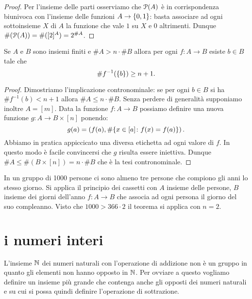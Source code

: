 \begin{proof}
Per l'insieme delle parti osserviamo che $\P(A)$ è in corrispondenza biunivoca con
l'insieme delle funzioni $A\to \ENCLOSE{0,1}$: basta associare ad ogni sottoinsieme $X$ di $A$ 
la funzione che vale $1$ su $X$ e $0$ altrimenti. 
Dunque $\#(\P(A)) = \#([2]^A) = 2^{\#A}$.
\end{proof}

\begin{theorem}
Se $A$ e $B$ sono insiemi finiti e $\#A > n\cdot \#B$ allora 
per ogni $f\colon A \to B$ esiste $b\in B$ tale che 
\[
 \# f^{-1}(\ENCLOSE{b}) \ge n+1.
\]
\end{theorem}
\begin{proof}
Dimostriamo l'implicazione contronominale: se per ogni $b\in B$ si ha $\# f^{-1}(b) < n+1$
allora $\#A \le n\cdot \#B$.
Senza perdere di generalità supponiamo inoltre $A=[m]$.
Data la funzione $f\colon A\to B$ possiamo definire una nuova funzione $g\colon A\to B\times[n]$ 
ponendo:
\[
  g(a) = \left(f(a),\# \ENCLOSE{x\in [a]\colon f(x)=f(a)}\right).
\]
Abbiamo in pratica appiccicato una diversa etichetta ad ogni valore di $f$. 
In questo modo è facile convincersi che $g$ risulta essere iniettiva.
Dunque $\#A \le \#(B\times [n]) = n\cdot \# B$ che è la tesi contronominale.
\end{proof}

\begin{example}
In un gruppo di 1000 persone ci sono almeno tre persone che compiono gli anni lo stesso giorno.
Si applica il principio dei cassetti con $A$ insieme delle persone, 
$B$ insieme dei giorni dell'anno $f\colon A\to B$ che associa ad ogni persona il giorno
del suo compleanno. Visto che $1000 > 366 \cdot 2$ il teorema si applica con $n=2$.
\end{example}

\section{i numeri interi}

L'insieme $\NN$ dei numeri naturali con l'operazione di addizione 
non è un gruppo in quanto gli elementi non hanno opposto in $\NN$.
Per ovviare a questo vogliamo definire un insieme più grande 
che contenga anche gli opposti dei numeri naturali e su cui si possa 
quindi definire l'operazione di sottrazione. 

